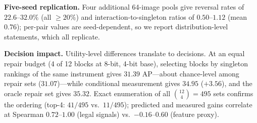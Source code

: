 \smallskip
\noindent\textbf{Five-seed replication.}
Four additional 64-image pools give reversal rates of
$22.6$--$32.0\%$ (all $\geq 20\%$) and interaction-to-singleton ratios
of $0.50$--$1.12$ (mean $0.76$); per-pair values are seed-dependent, so
we report distribution-level statements, which all replicate.

\smallskip
\noindent\textbf{Decision impact.}
Utility-level differences translate to decisions. At an equal repair
budget (4 of 12 blocks at 8-bit, 4-bit base), selecting blocks by
singleton rankings of the same instrument gives $31.39$ AP---about
chance-level among repair sets ($31.07$)---while conditional measurement
gives $34.95$ ($+3.56$), and the oracle repair set gives $35.32$. Exact
enumeration of all $\binom{12}{4}=495$ sets confirms the ordering
(top-4: $41/495$ vs.\ $11/495$); predicted and
measured gains correlate at Spearman $0.72$--$1.00$ (legal signals)
vs.\ $-0.16$--$0.60$ (feature proxy).
